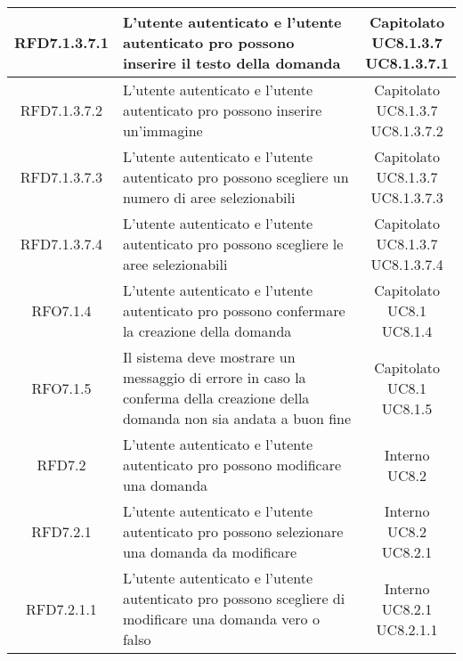 \begin{longtable}{|c|>{\centering}m{7cm}|c|}
			 \hypertarget{{RFD7.1.3.7.1}}{{RFD7.1.3.7.1}} & L’utente autenticato e l’utente autenticato pro possono inserire il testo della domanda & \makecell{Capitolato\\ UC8.1.3.7 \\UC8.1.3.7.1 } \\ \hline
			 \hypertarget{{RFD7.1.3.7.2}}{{RFD7.1.3.7.2}} & L’utente autenticato e l’utente autenticato pro possono inserire un’immagine & \makecell{Capitolato\\ UC8.1.3.7 \\UC8.1.3.7.2 } \\ \hline
			 \hypertarget{{RFD7.1.3.7.3}}{{RFD7.1.3.7.3}} & L’utente autenticato e l’utente autenticato pro possono scegliere un numero di aree selezionabili & \makecell{Capitolato\\ UC8.1.3.7 \\UC8.1.3.7.3 } \\ \hline
			 \hypertarget{{RFD7.1.3.7.4}}{{RFD7.1.3.7.4}} & L’utente autenticato e l’utente autenticato pro possono scegliere le aree  selezionabili & \makecell{Capitolato\\ UC8.1.3.7 \\UC8.1.3.7.4 } \\ \hline
			 \hypertarget{{RFO7.1.4}}{{RFO7.1.4}} & L’utente autenticato e l'utente autenticato pro possono confermare la creazione della domanda & \makecell{Capitolato\\ UC8.1 \\UC8.1.4 } \\ \hline
			 \hypertarget{{RFO7.1.5}}{{RFO7.1.5}} & Il sistema deve mostrare un messaggio di errore in caso la conferma della creazione della domanda non sia andata a buon fine & \makecell{Capitolato\\ UC8.1 \\UC8.1.5 } \\ \hline
			 \hypertarget{{RFD7.2}}{{RFD7.2}} & L’utente autenticato e l’utente autenticato pro possono modificare una domanda & \makecell{Interno\\ UC8.2 } \\ \hline
			 \hypertarget{{RFD7.2.1}}{{RFD7.2.1}} & L’utente autenticato e l'utente autenticato pro possono selezionare una domanda da modificare & \makecell{Interno\\ UC8.2 \\UC8.2.1 } \\ \hline
			 \hypertarget{{RFD7.2.1.1}}{{RFD7.2.1.1}} & L’utente autenticato e l’utente autenticato pro possono scegliere di modificare una domanda vero o falso & \makecell{Interno\\ UC8.2.1 \\UC8.2.1.1 } \\ \hline

\end{longtable}
